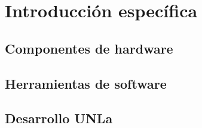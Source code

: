 \chapter{Introducción específica} %

\section{Componentes de hardware}


\section{Herramientas de software}


\section{Desarrollo UNLa}

